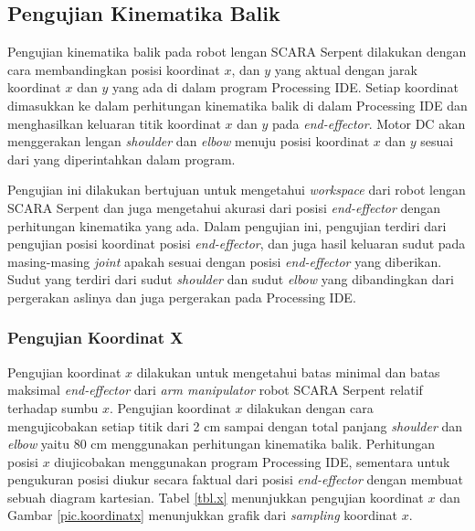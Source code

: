 \subsection{Pengujian Kinematika Balik}
Pengujian kinematika balik pada robot lengan SCARA Serpent dilakukan dengan cara membandingkan posisi koordinat $x$, dan $y$ yang aktual dengan jarak koordinat $x$ dan $y$ yang ada di dalam program Processing IDE. Setiap koordinat dimasukkan ke dalam perhitungan kinematika balik di dalam Processing IDE dan menghasilkan keluaran titik koordinat $x$ dan $y$ pada \textit{end-effector}. Motor DC akan menggerakan lengan \textit{shoulder} dan \textit{elbow} menuju posisi koordinat $x$ dan $y$ sesuai dari yang diperintahkan dalam program.

Pengujian ini dilakukan bertujuan untuk mengetahui \textit{workspace} dari robot lengan SCARA Serpent dan juga mengetahui akurasi dari posisi \textit{end-effector} dengan perhitungan kinematika yang ada. Dalam pengujian ini, pengujian terdiri dari pengujian posisi koordinat posisi \textit{end-effector}, dan juga hasil keluaran sudut pada masing-masing \textit{joint} apakah sesuai dengan posisi \textit{end-effector} yang diberikan. Sudut yang terdiri dari sudut \textit{shoulder} dan sudut \textit{elbow} yang dibandingkan dari pergerakan aslinya dan juga pergerakan pada Processing IDE.  

\subsubsection{Pengujian Koordinat X}

Pengujian koordinat $x$ dilakukan untuk mengetahui batas minimal dan batas maksimal \textit{end-effector} dari \textit{arm manipulator} robot SCARA Serpent relatif terhadap sumbu $x$. Pengujian koordinat $x$ dilakukan dengan cara mengujicobakan setiap titik dari 2 cm sampai dengan total panjang \textit{shoulder} dan \textit{elbow} yaitu 80 cm menggunakan perhitungan kinematika balik. Perhitungan posisi $x$ diujicobakan menggunakan program Processing IDE, sementara untuk pengukuran posisi diukur secara faktual dari posisi \textit{end-effector} dengan membuat sebuah diagram kartesian. Tabel \ref{tbl.x} menunjukkan pengujian koordinat $x$ dan Gambar \ref{pic.koordinatx} menunjukkan grafik dari \textit{sampling} koordinat $x$.

\fontsize{8}{10}\selectfont

